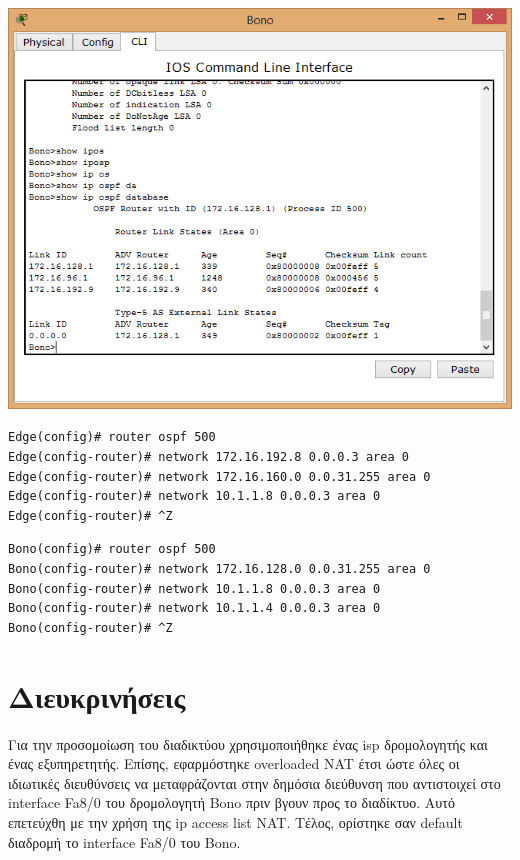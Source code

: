 \documentclass{assignment}
\begin{document}
\begin{center}
\includegraphics[width=\textwidth, height=\textheight, keepaspectratio]{images/ipospfdb.png}
\end{center}

\begin{verbatim}
Edge(config)# router ospf 500
Edge(config-router)# network 172.16.192.8 0.0.0.3 area 0
Edge(config-router)# network 172.16.160.0 0.0.31.255 area 0
Edge(config-router)# network 10.1.1.8 0.0.0.3 area 0
Edge(config-router)# ^Z
\end{verbatim}

\begin{verbatim}
Bono(config)# router ospf 500
Bono(config-router)# network 172.16.128.0 0.0.31.255 area 0
Bono(config-router)# network 10.1.1.8 0.0.0.3 area 0
Bono(config-router)# network 10.1.1.4 0.0.0.3 area 0
Bono(config-router)# ^Z
\end{verbatim}

\section{Διευκρινήσεις}
Για την προσομοίωση του διαδικτύου χρησιμοποιήθηκε ένας isp δρομολογητής
και ένας εξυπηρετητής. Επίσης, εφαρμόστηκε overloaded NAT έτσι ώστε όλες οι ιδιωτικές
διευθύνσεις να μεταφράζονται στην δημόσια διεύθυνση που αντιστοιχεί στο
interface Fa8/0 του δρομολογητή Bono πριν βγουν προς το διαδίκτυο. Αυτό επετεύχθη με την χρήση της ip access list NAT. Τέλος, ορίστηκε σαν default διαδρομή
το interface Fa8/0 του Bono.
%
%

\newpage
\end{document}
